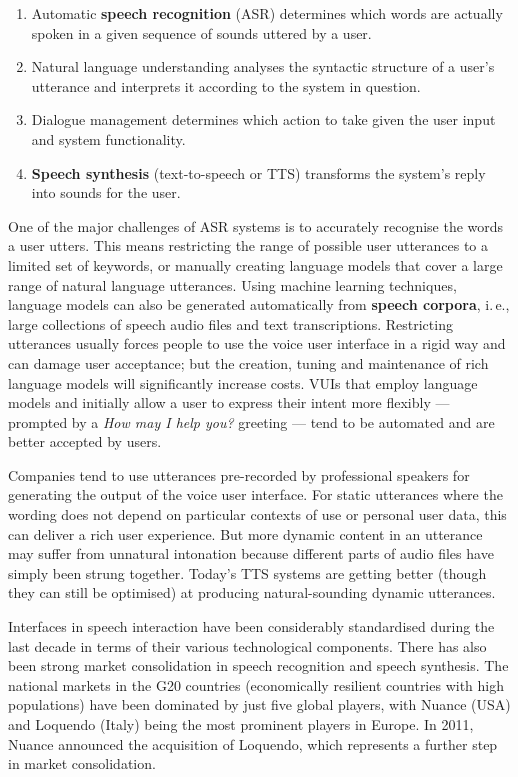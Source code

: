\begin{multicols}{2}
\begin{enumerate}
\item Automatic \textbf{speech recognition} (ASR) determines which words are actually spoken in a given sequence of sounds uttered by a user.
\item Natural language understanding analyses the syntactic structure of a user’s utterance and interprets it according to the system in question.
\item  Dialogue management determines which action to take given the user input and system functionality.
\item \textbf{Speech synthesis} (text-to-speech or TTS) transforms the system’s reply into sounds for the user. 
\end{enumerate}
One of the major challenges of ASR systems is to accurately recognise the words a user utters. This means restricting the range of possible user utterances to a limited set of keywords, or manually creating language models that cover a large range of natural language utterances. Using machine learning techniques, language models can also be generated automatically from \textbf{speech corpora}, i.\,e., large collections of speech audio files and text transcriptions. Restricting utterances usually forces people to use the voice user interface in a rigid way and can damage user acceptance; but the creation, tuning and maintenance of rich language models will significantly increase costs. VUIs that employ language models and initially allow a user to express their intent more flexibly — prompted by a \textit{How may I help you?} greeting — tend to be automated and are better accepted by users. 


Companies tend to use utterances pre-recorded by professional speakers for generating the output of the voice user interface. For static utterances where the wording does not depend on particular contexts of use or personal user data, this can deliver a rich user experience. But more dynamic content in an utterance may suffer from unnatural intonation because different parts of audio files have simply been strung together. Today’s TTS systems are getting better (though they can still be optimised) at producing natural-sounding dynamic utterances.  


Interfaces in speech interaction have been considerably standardised during the last decade in terms of their various technological components. There has also been strong market consolidation in speech recognition and speech synthesis. The national markets in the G20 countries (economically resilient countries with high populations) have been dominated by just five global players, with Nuance (USA) and Loquendo (Italy) being the most prominent players in Europe. In 2011, Nuance announced the acquisition of Loquendo, which represents a further step in market consolidation.


\end{multicols}
